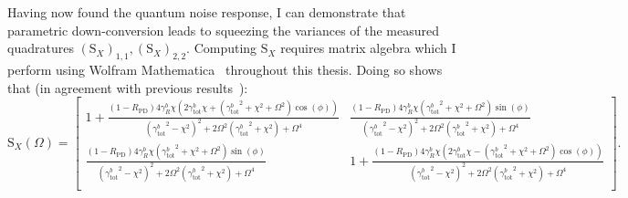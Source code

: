 Having now found the quantum noise response, I can demonstrate that parametric down-conversion leads to squeezing the variances of the measured quadratures $(\text{S}_X)_{1,1}, (\text{S}_X)_{2,2}$. Computing $\text{S}_X$ requires matrix algebra which I perform using Wolfram Mathematica~\cite{} throughout this thesis. Doing so shows that (in agreement with previous results~\cite{}): 
$$\label{eq:dOPO_full_freedom}
\text{S}_X(\Omega)=\left[
\begin{array}{cc}
 1+\frac{(1-R_\text{PD})4 \gamma^b_R \chi  \left(2 \gamma^b_\text{tot} \chi +\left({\gamma^b_\text{tot}}^2+\chi ^2+\Omega ^2\right) \cos (\phi )\right)}{\left({\gamma^b_\text{tot}}^2-\chi ^2\right)^2+2 \Omega ^2 \left({\gamma^b_\text{tot}}^2+\chi ^2\right)+\Omega ^4} 
 & \frac{(1-R_\text{PD})4 \gamma^b_R \chi  \left({\gamma^b_\text{tot}}^2+\chi ^2+\Omega ^2\right) \sin (\phi )}{\left({\gamma^b_\text{tot}}^2-\chi ^2\right)^2+2 \Omega ^2 \left({\gamma^b_\text{tot}}^2+\chi ^2\right)+\Omega ^4} \\
 \frac{(1-R_\text{PD})4 \gamma^b_R \chi  \left({\gamma^b_\text{tot}}^2+\chi ^2+\Omega ^2\right) \sin (\phi )}{\left({\gamma^b_\text{tot}}^2-\chi ^2\right)^2+2 \Omega ^2 \left({\gamma^b_\text{tot}}^2+\chi ^2\right)+\Omega ^4} 
 & 1+\frac{(1-R_\text{PD})4 \gamma^b_R \chi  \left(2 \gamma^b_\text{tot} \chi -\left({\gamma^b_\text{tot}}^2+\chi ^2+\Omega ^2\right) \cos (\phi )\right)}{\left({\gamma^b_\text{tot}}^2-\chi ^2\right)^2+2 \Omega ^2 \left({\gamma^b_\text{tot}}^2+\chi ^2\right)+\Omega ^4} \\
\end{array}
\right].$$

